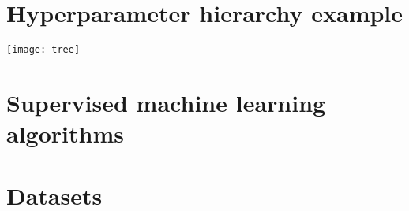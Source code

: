 \appendix
\chapter{Hyperparameter hierarchy example}
	\label{ap:hyperparam_hierarchy}

\texttt{[image: tree]}

\chapter{Supervised machine learning algorithms}

\chapter{Datasets}
